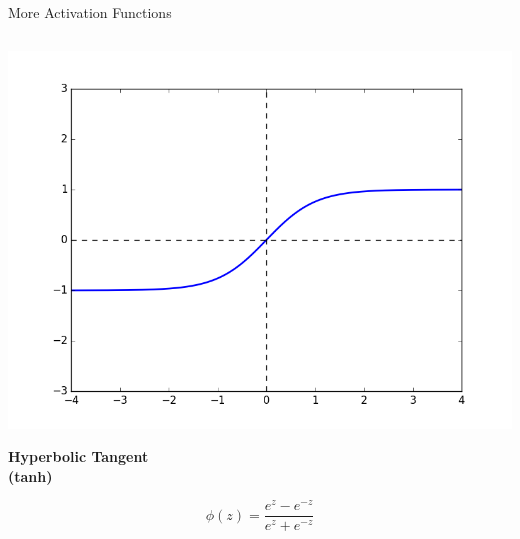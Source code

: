 \documentclass[11pt,handout,aspectratio=169]{beamer}
\begin{document}
\begin{frame}{More Activation Functions}
\begin{columns}
    \begin{column}{0.3 \linewidth}
      \includegraphics[width=\linewidth]{pics/act_tanh.png}
      \begin{center}
        {\bf Hyperbolic Tangent} \\
        {\bf (tanh)}
      \end{center}
      \[ \phi(z) = \frac{e^{z} - e^{-z}}{e^{z} + e^{-z}} \]
    \end{column}
  \end{columns}
\end{frame}
\end{document}
